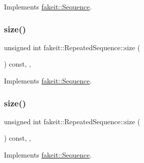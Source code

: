 Implements \mbox{\hyperlink{classfakeit_1_1Sequence_aa9a45b45fc715148832a9dfb7b555556}{fakeit\+::\+Sequence}}.

\mbox{\label{classfakeit_1_1RepeatedSequence_a64d52ac14ca69a34e8188e856e6b51a6}} 
\subsubsection{\texorpdfstring{size()}{size()}\hspace{0.1cm}{\footnotesize\ttfamily [7/9]}}
{\footnotesize\ttfamily unsigned int fakeit\+::\+Repeated\+Sequence\+::size (\begin{DoxyParamCaption}{ }\end{DoxyParamCaption}) const\hspace{0.3cm}{\ttfamily [inline]}, {\ttfamily [override]}, {\ttfamily [virtual]}}



Implements \mbox{\hyperlink{classfakeit_1_1Sequence_aa9a45b45fc715148832a9dfb7b555556}{fakeit\+::\+Sequence}}.

\mbox{\label{classfakeit_1_1RepeatedSequence_a64d52ac14ca69a34e8188e856e6b51a6}} 
\subsubsection{\texorpdfstring{size()}{size()}\hspace{0.1cm}{\footnotesize\ttfamily [8/9]}}
{\footnotesize\ttfamily unsigned int fakeit\+::\+Repeated\+Sequence\+::size (\begin{DoxyParamCaption}{ }\end{DoxyParamCaption}) const\hspace{0.3cm}{\ttfamily [inline]}, {\ttfamily [override]}, {\ttfamily [virtual]}}



Implements \mbox{\hyperlink{classfakeit_1_1Sequence_aa9a45b45fc715148832a9dfb7b555556}{fakeit\+::\+Sequence}}.

\mbox{\label{classfakeit_1_1RepeatedSequence_a64d52ac14ca69a34e8188e856e6b51a6}} 
